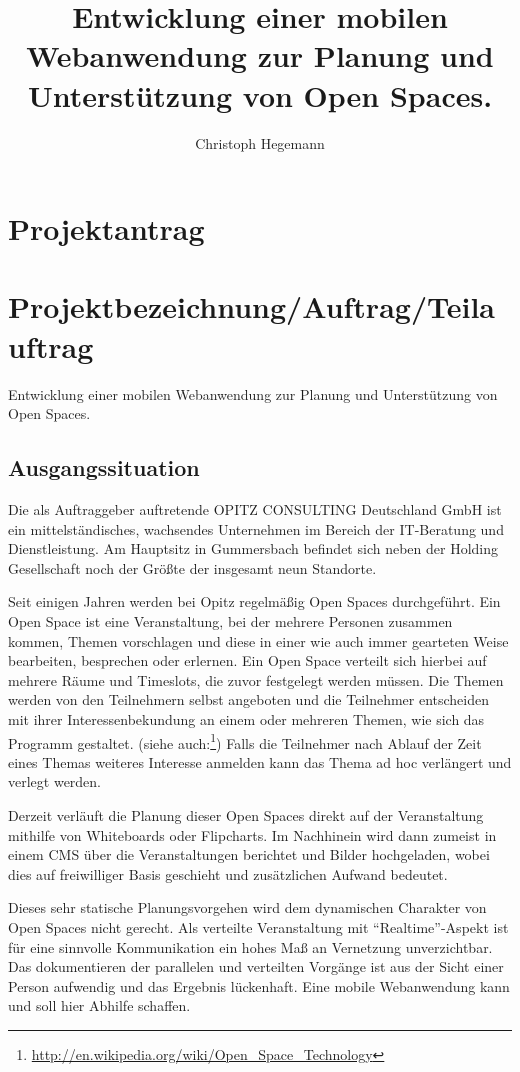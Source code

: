 \documentclass[12pt,a4paper]{scrartcl}
\title{Entwicklung einer mobilen Webanwendung zur Planung und Unterstützung von Open Spaces.
}
\author{Christoph Hegemann}
\begin{document}
\maketitle
\newpage
%
%
%
\section{Projektantrag}
\section*{Projektbezeichnung/Auftrag/Teilauftrag}
Entwicklung einer mobilen Webanwendung zur Planung und Unterstützung von Open Spaces.
\subsection*{Ausgangssituation}
Die als Auftraggeber auftretende OPITZ CONSULTING Deutschland GmbH ist ein mittelständisches, wachsendes Unternehmen im Bereich der IT-Beratung und Dienstleistung. Am Hauptsitz in Gummersbach befindet sich neben der Holding Gesellschaft noch der Größte der insgesamt neun Standorte.

\noindent Seit einigen Jahren werden bei Opitz regelmäßig Open Spaces durchgeführt.
Ein Open Space ist eine Veranstaltung, bei der mehrere Personen zusammen kommen, Themen vorschlagen und diese in einer wie auch immer gearteten Weise bearbeiten, besprechen oder erlernen. Ein Open Space verteilt sich hierbei auf mehrere Räume und Timeslots, die zuvor festgelegt werden müssen. Die Themen werden von den Teilnehmern selbst angeboten und die Teilnehmer entscheiden mit ihrer Interessenbekundung an einem oder mehreren Themen, wie sich das Programm gestaltet.
(siehe auch:\footnote{\url{http://en.wikipedia.org/wiki/Open_Space_Technology}})
Falls die Teilnehmer nach Ablauf der Zeit eines Themas weiteres Interesse anmelden kann das Thema ad hoc verlängert und verlegt werden.

\noindent Derzeit verläuft die Planung dieser Open Spaces direkt auf der Veranstaltung mithilfe von Whiteboards oder Flipcharts. Im Nachhinein wird dann zumeist in einem CMS über die Veranstaltungen berichtet und Bilder hochgeladen, wobei dies auf freiwilliger Basis geschieht und zusätzlichen Aufwand bedeutet.

\noindent Dieses sehr statische Planungsvorgehen wird dem dynamischen Charakter von Open Spaces nicht gerecht. Als verteilte Veranstaltung mit ``Realtime''-Aspekt ist für eine sinnvolle Kommunikation ein hohes Maß an Vernetzung unverzichtbar. Das dokumentieren der parallelen und verteilten Vorgänge ist aus der Sicht einer Person aufwendig und das Ergebnis lückenhaft. Eine mobile Webanwendung kann und soll hier Abhilfe schaffen.
\end{document}
